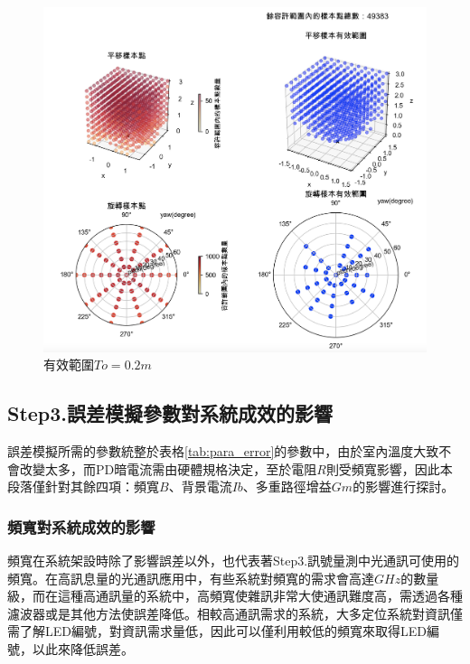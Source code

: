 \begin{figure}[htpb]
    \centering
    \includegraphics[width=15cm]{ch4pic/to02.png}
    \caption{有效範圍$To=0.2m$}
    \label{pic:to02}
\end{figure}










\subsection{Step3.誤差模擬參數對系統成效的影響}
\label{chp:effect_error_para}


誤差模擬所需的參數統整於表格\ref{tab:para_error}的參數中，由於室內溫度大致不會改變太多，而PD暗電流需由硬體規格決定，至於電阻$R$則受頻寬影響，因此本段落僅針對其餘四項：頻寬$B$、背景電流$Ib$、多重路徑增益$Gm$的影響進行探討。

    \subsubsection{頻寬對系統成效的影響}
    \label{chp:effect_bandwidth}

    頻寬在系統架設時除了影響誤差以外，也代表著Step3.訊號量測中光通訊可使用的頻寬。在高訊息量的光通訊應用中，有些系統對頻寬的需求會高達$GHz$的數量級，而在這種高通訊量的系統中，高頻寬使雜訊非常大使通訊難度高，需透過各種濾波器或是其他方法使誤差降低。相較高通訊需求的系統，大多定位系統對資訊僅需了解LED編號，對資訊需求量低，因此可以僅利用較低的頻寬來取得LED編號，以此來降低誤差。

